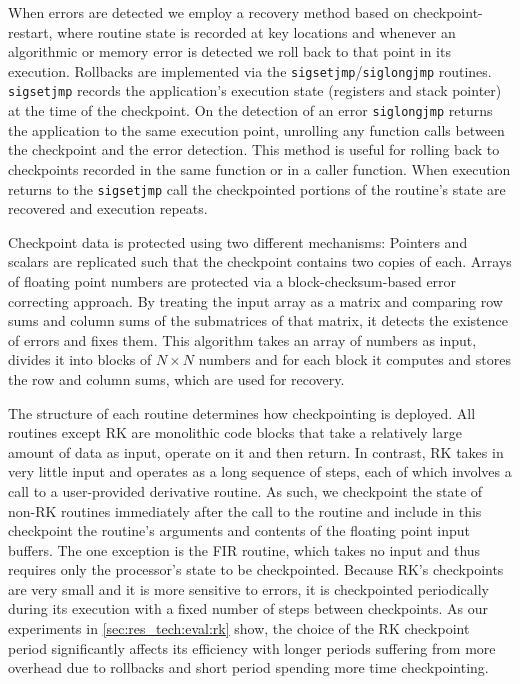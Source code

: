 \documentclass{sig-alternate}
\begin{document}
When errors are detected we employ a recovery method based on checkpoint-restart, where routine state is recorded at key locations and whenever an algorithmic or memory error is detected we roll back to that point in its execution.
Rollbacks are implemented via the \texttt{sigsetjmp}/\texttt{siglongjmp} \cite{sigsetjmp:1997} routines.
\texttt{sigsetjmp} records the application's execution state (registers and stack pointer) at the time of the checkpoint.
On the detection of an error \texttt{siglongjmp} returns the application to the same execution point, unrolling any function calls between the checkpoint and the error detection.
This method is useful for rolling back to checkpoints recorded in the same function or in a caller function.
When execution returns to the \texttt{sigsetjmp} call the checkpointed portions of the routine's state are recovered and execution repeats.

Checkpoint data is protected using two different mechanisms:
Pointers and scalars are replicated such that the checkpoint contains two copies of each.
Arrays of floating point numbers are protected via a block-checksum-based error correcting approach.
By treating the input array as a matrix and comparing row sums and column sums of the submatrices of that matrix, it detects the existence of errors and fixes them.
This algorithm takes an array of numbers as input, divides it into blocks of $N \times N$ numbers and for each block it computes and stores the row and column sums, which are used for recovery.

The structure of each routine determines how checkpointing is deployed.
All routines except RK are monolithic code blocks that take a relatively large amount of data as input, operate on it and then return.
In contrast, RK takes in very little input and operates as a long sequence of steps, each of which involves a call to a user-provided derivative routine.
As such, we checkpoint the state of non-RK routines immediately after the call to the routine and include in this checkpoint the routine's arguments and contents of the floating point input buffers.
The one exception is the FIR routine, which takes no input and thus requires only the processor's state to be checkpointed.
Because RK's checkpoints are very small and it is more sensitive to errors, it is checkpointed periodically during its execution with a fixed number of steps between checkpoints.
As our experiments in \ref{sec:res_tech:eval:rk} show, the choice of the RK checkpoint period significantly affects its efficiency with longer periods suffering from more overhead due to rollbacks and short period spending more time checkpointing.
\end{document}
